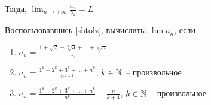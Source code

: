 \documentclass[a4paper]{article}
\begin{document}
\begin{enumerate}
\begin{framed}
\begin{theorem}[Штольца]
                Тогда, $\lim_{n \to +\infty} \frac{a_n}{b_n} = L$
            \end{theorem}
        \end{framed}
        
        Воспользовавшись \ref{shtolz}, вычислить: $\lim a_n$, если
        \begin{enumerate}[label=\alph*)]
        \item $a_n = \frac{1 + \sqrt{2} + \sqrt[3]{3} + \dots + \sqrt[n]{n}}{n}$
        \item $a_n = \frac{1^k + 2^k + 3^k + \dots + n^k}{n^{k + 1}}$, $k \in \mathbb{N}$ -- произвольное
        \item $a_n = \frac{1^k + 2^k + 3^k + \dots + n^k}{n^k} - \frac{n}{k + 1}$, $k \in \mathbb{N}$ -- произвольное
        \end{enumerate}
    \end{enumerate}
\end{document}

